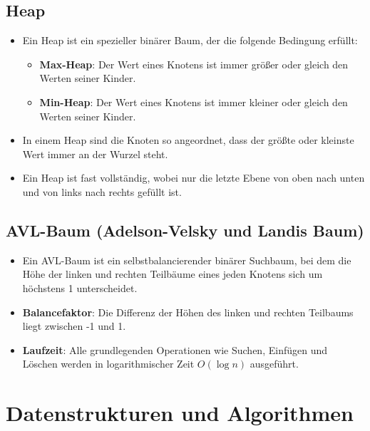 \documentclass[a4paper,12pt]{article}
\begin{document}
\vspace{1em}

\subsection{Heap}
\begin{itemize}
    \item Ein Heap ist ein spezieller binärer Baum, der die folgende Bedingung erfüllt:
    \begin{itemize}
        \item \textbf{Max-Heap}: Der Wert eines Knotens ist immer größer oder gleich den Werten seiner Kinder.
        \item \textbf{Min-Heap}: Der Wert eines Knotens ist immer kleiner oder gleich den Werten seiner Kinder.
    \end{itemize}
    \item In einem Heap sind die Knoten so angeordnet, dass der größte oder kleinste Wert immer an der Wurzel steht.
    \item Ein Heap ist fast vollständig, wobei nur die letzte Ebene von oben nach unten und von links nach rechts gefüllt ist.
\end{itemize}

\vspace{1em} 

\subsection{AVL-Baum (Adelson-Velsky und Landis Baum)}
\begin{itemize}
    \item Ein AVL-Baum ist ein selbstbalancierender binärer Suchbaum, bei dem die Höhe der linken und rechten Teilbäume eines jeden Knotens sich um höchstens 1 unterscheidet.
    \item \textbf{Balancefaktor}: Die Differenz der Höhen des linken und rechten Teilbaums liegt zwischen -1 und 1.
    \item \textbf{Laufzeit}: Alle grundlegenden Operationen wie Suchen, Einfügen und Löschen werden in logarithmischer Zeit \( O(\log n) \) ausgeführt.
\end{itemize}

\vspace{1em}

\section{Datenstrukturen und Algorithmen}
\end{document}
